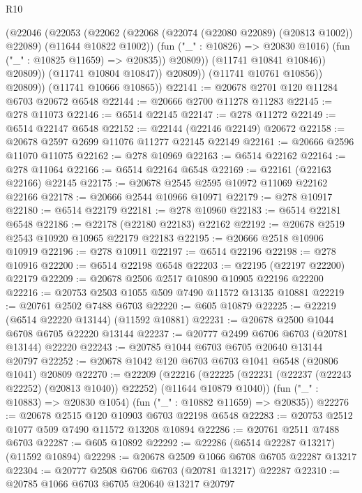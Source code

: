 \begin{lexlean}{R10}
\begin{coremodule}
{{{{{{{{{{{{{{{{{{{{{{{{{{{{{{{{{{{{{{{{{{{{{{{{{{{{{{{{{{{{{{{{{{{{{{{{{{{{{{{{{{{{                          (@22046
                            (@22053
                              (@22062
                                (@22068 (@22074 (@22080 @22089) (@20813 @1002)) @22089)
                                (@11644 @10822 @1002))
                              (fun ("_" : @10826) => @20830 @1016)
                              (fun ("_" : @10825 @11659) => @20835))
                            @20809))
                        (@11741 @10841 @10846))
                      @20809))
                  (@11741 @10804 @10847))
                @20809))
            (@11741 @10761 @10856))
          @20809))
      (@11741 @10666 @10865))
@22141 := @20678 @2701 @120 @11284 @6703 @20672 @6548
@22144 := @20666 @2700 @11278 @11283
@22145 := @278 @11073
@22146 := @6514 @22145
@22147 := @278 @11272
@22149 := @6514 @22147 @6548
@22152 := @22144 (@22146 @22149) @20672
@22158 := @20678 @2597 @2699 @11076 @11277 @22145 @22149
@22161 := @20666 @2596 @11070 @11075
@22162 := @278 @10969
@22163 := @6514 @22162
@22164 := @278 @11064
@22166 := @6514 @22164 @6548
@22169 := @22161 (@22163 @22166) @22145
@22175 := @20678 @2545 @2595 @10972 @11069 @22162 @22166
@22178 := @20666 @2544 @10966 @10971
@22179 := @278 @10917
@22180 := @6514 @22179
@22181 := @278 @10960
@22183 := @6514 @22181 @6548
@22186 := @22178 (@22180 @22183) @22162
@22192 := @20678 @2519 @2543 @10920 @10965 @22179 @22183
@22195 := @20666 @2518 @10906 @10919
@22196 := @278 @10911
@22197 := @6514 @22196
@22198 := @278 @10916
@22200 := @6514 @22198 @6548
@22203 := @22195 (@22197 @22200) @22179
@22209 := @20678 @2506 @2517 @10890 @10905 @22196 @22200
@22216 := @20753 @2503 @1055 @509 @7490 @11572 @13135 @10881
@22219 := @20761 @2502 @7488 @6703
@22220 := @605 @10879
@22225 := @22219 (@6514 @22220 @13144) (@11592 @10881)
@22231 := @20678 @2500 @1044 @6708 @6705 @22220 @13144
@22237 := @20777 @2499 @6706 @6703 (@20781 @13144) @22220
@22243 := @20785 @1044 @6703 @6705 @20640 @13144 @20797
@22252 := @20678 @1042 @120 @6703 @6703 @1041 @6548 (@20806 @1041) @20809
@22270 := @22209
    (@22216
      (@22225 (@22231 (@22237 (@22243 @22252) (@20813 @1040)) @22252) (@11644 @10879 @1040))
      (fun ("_" : @10883) => @20830 @1054)
      (fun ("_" : @10882 @11659) => @20835))
@22276 := @20678 @2515 @120 @10903 @6703 @22198 @6548
@22283 := @20753 @2512 @1077 @509 @7490 @11572 @13208 @10894
@22286 := @20761 @2511 @7488 @6703
@22287 := @605 @10892
@22292 := @22286 (@6514 @22287 @13217) (@11592 @10894)
@22298 := @20678 @2509 @1066 @6708 @6705 @22287 @13217
@22304 := @20777 @2508 @6706 @6703 (@20781 @13217) @22287
@22310 := @20785 @1066 @6703 @6705 @20640 @13217 @20797
}}}}}}}}}}}}}}}}}}}}}}}}}}}}}}}}}}}}}}}}}}}}}}}}}}}}}}}}}}}}}}}}}}}}}}}}}}}}}}}}}}}}
\end{coremodule}
\end{lexlean}
